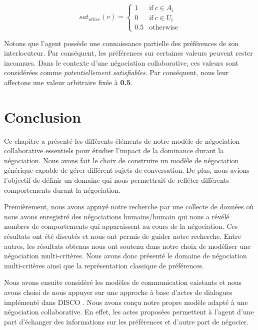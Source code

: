 					\begin{equation}
					sat_{other}(v)= \left\{\begin{array}{ll}
					1	 & \mathrm{if\ }  c \in A_i\\
					0    & \mathrm{if\ }c \in U_i\\
					0.5	 & \mathrm{otherwise}
					\end{array}\right.
					\end{equation}
					
				Notons que l'agent possède une connaissance partielle des préférences de son interlocuteur. Par conséquent, les préférences sur certaines valeurs peuvent rester inconnues. Dans  le contexte d'une négociation collaborative, ces valeurs sont considérées comme \textit{potentiellement satisfiables}. Par conséquent, nous leur affectons une valeur arbitraire fixée à \textbf{0.5}.
				
	\section{Conclusion}
			Ce chapitre a présenté les différents éléments de notre modèle de négociation collaborative essentiels pour étudier l'impact de la dominance durant la négociation. Nous avons fait le choix de construire un modèle de négociation générique capable de gérer différent sujets de conversation. De plus, nous avions l'objectif de définir un domaine qui nous permettrait de refléter différents comportements durant la négociation. 
			
			Premièrement, nous avons appuyé notre recherche par une collecte de données où nous avons enregistré des négociations humains/humain qui nous a révélé nombres de comportements qui apparaissent au cours de la négociation. Ces résultats ont été discutés et nous ont permis de guider notre recherche. Entre autres, les résultats obtenus nous ont soutenu dans notre choix de modéliser une négociation  multi-critères.
			Nous avons donc présenté le domaine de négociation multi-critères ainsi que la représentation classique de préférences.
			
			Nous avons ensuite considéré les modèles de communication existants et nous avons choisi de nous appuyer sur une approche à base d'actes de dialogues implémenté dans DISCO \cite{rich09}. Nous avons conçu notre propre modèle adapté à une négociation collaborative. En effet, les actes proposées permettent à l'agent d'une part d'échanger des informations sur les préférences et d'autre part de négocier. 
			
